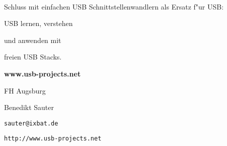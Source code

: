 \documentclass[11pt]{article}
\begin{document}
\begin{minipage}[t]{7cm}
\hfill {\Large\sf \ }\\


{\Large
\begin{center}
   Schluss mit einfachen USB Schnittstellenwandlern
	 als Ersatz f"ur USB:

\smallskip
	USB lernen, verstehen

\smallskip
	
	und anwenden mit

\smallskip

	freien USB Stacks.

\end{center} 
}


\vskip 5mm

\centerline{\large\bf www.usb-projects.net}

\vskip 5mm

\bigskip

\centerline{FH Augsburg}

\bigskip

\centerline{Benedikt Sauter}

\bigskip

\centerline{{\tt sauter@ixbat.de}}

\bigskip

\centerline{{\tt http://www.usb-projects.net}}

\end{minipage}
\end{document}
